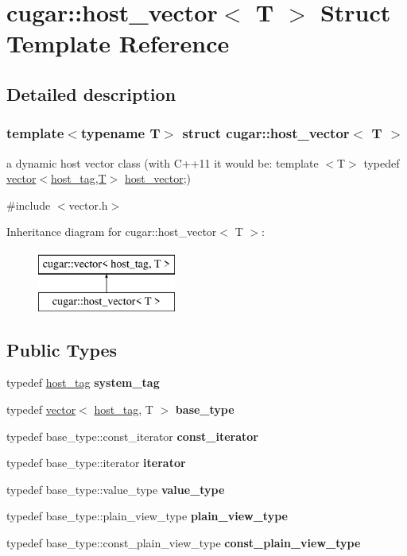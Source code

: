 \hypertarget{structcugar_1_1host__vector}{}\section{cugar\+:\+:host\+\_\+vector$<$ T $>$ Struct Template Reference}
\label{structcugar_1_1host__vector}


\subsection{Detailed description}
\subsubsection*{template$<$typename T$>$\newline
struct cugar\+::host\+\_\+vector$<$ T $>$}

a dynamic host vector class (with C++11 it would be\+: template $<$\+T$>$ typedef \hyperlink{structcugar_1_1vector}{vector$<$host\+\_\+tag,\+T$>$} \hyperlink{structcugar_1_1host__vector}{host\+\_\+vector};) 

{\ttfamily \#include $<$vector.\+h$>$}

Inheritance diagram for cugar\+:\+:host\+\_\+vector$<$ T $>$\+:\begin{figure}[H]
\begin{center}
\leavevmode
\includegraphics[height=2.000000cm]{structcugar_1_1host__vector}
\end{center}
\end{figure}
\subsection*{Public Types}
\begin{DoxyCompactItemize}
\item 
typedef \hyperlink{structcugar_1_1host__tag}{host\+\_\+tag} {\bfseries system\+\_\+tag}
\item 
typedef \hyperlink{structcugar_1_1vector}{vector}$<$ \hyperlink{structcugar_1_1host__tag}{host\+\_\+tag}, T $>$ {\bfseries base\+\_\+type}
\item 
typedef base\+\_\+type\+::const\+\_\+iterator {\bfseries const\+\_\+iterator}
\item 
typedef base\+\_\+type\+::iterator {\bfseries iterator}
\item 
typedef base\+\_\+type\+::value\+\_\+type {\bfseries value\+\_\+type}
\item 
typedef base\+\_\+type\+::plain\+\_\+view\+\_\+type {\bfseries plain\+\_\+view\+\_\+type}
\item 
typedef base\+\_\+type\+::const\+\_\+plain\+\_\+view\+\_\+type {\bfseries const\+\_\+plain\+\_\+view\+\_\+type}
\end{DoxyCompactItemize}
